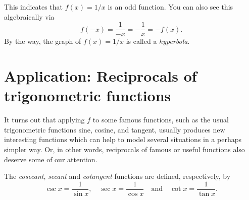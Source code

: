 \documentclass{ximera}
\begin{document}
\begin{image}
\end{image}

This indicates that $f(x) = 1/x$ is an odd function. You can also see this algebraically via \[  f(-x) = \frac{1}{-x} = -\frac{1}{x} = -f(x).  \]
By the way, the graph of $f(x) = 1/x$ is called a \emph{hyperbola}.

\section{Application: Reciprocals of trigonometric functions}

It turns out that applying $f$ to some famous functions, such as the usual trigonometric functions sine, cosine, and tangent, usually produces new interesting functions which can help to model several situations in a perhaps simpler way. Or, in other words, reciprocals of famous or useful functions also deserve some of our attention.

\begin{definition}
  The \emph{cosecant}, \emph{secant} and \emph{cotangent} functions are defined, respectively, by \[   \csc x = \frac{1}{\sin x}, \quad \sec x = \frac{1}{\cos x} \quad\mbox{and}\quad \cot x = \frac{1}{\tan x}.  \]
\end{definition}
\end{document}
